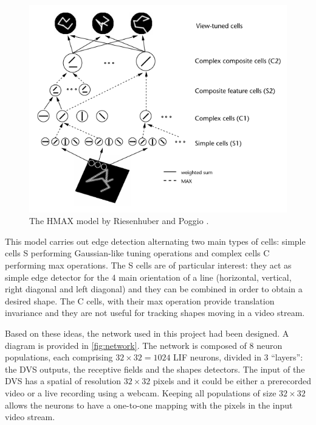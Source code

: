 \begin{figure}[ht]
\centering
\includegraphics[scale=0.5]{images/development/hmax.png}
\caption[HMAX Model]{The HMAX model by Riesenhuber and Poggio \cite{Riesenhuber1999}.}
\label{fig:hmax}
\end{figure}

This model carries out edge detection alternating two main types of cells: simple cells \textsc{S} performing Gaussian-like tuning operations and complex cells \textsc{C} performing max operations. The \textsc{S} cells are of particular interest: they act as simple edge detector for the 4 main orientation of a line (horizontal, vertical, right diagonal and left diagonal) and they can be combined in order to obtain a desired shape. The \textsc{C} cells, with their max operation provide translation invariance and they are not useful for tracking shapes moving in a video stream.

Based on these ideas, the network used in this project had been designed. A diagram is provided in \cref{fig:network}. The network is composed of 8 neuron populations, each comprising  $32 \times 32 = 1024$ LIF neurons, divided in 3 ``layers'': the DVS outputs, the receptive fields and the shapes detectors. The input of the DVS has a spatial of resolution $32 \times 32$ pixels and it could be either a prerecorded video or a live recording using a webcam. Keeping all populations of size $32 \times 32$ allows the neurons to have a one-to-one mapping with the pixels in the input video stream. 

